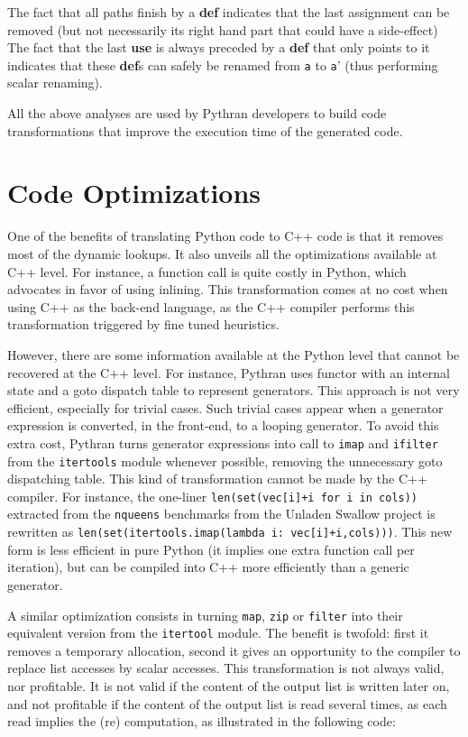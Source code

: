 \documentclass[10pt, onecolumn, preprint]{sigplanconf}
\begin{document}
The fact that all paths finish by a \textbf{def} indicates that the last
assignment can be removed (but not necessarily its right hand part that could
have a side-effect) %
The fact that the last \textbf{use} is always preceded by
a \textbf{def} that only points to it indicates that these \textbf{def}s can
safely be renamed from \texttt{a} to \texttt{a}' (thus performing scalar
renaming).

All the above analyses are used by Pythran developers to build code
transformations that improve the execution time of the generated code.

\section{Code Optimizations}
\label{sec:optimizations}

One of the benefits of translating Python code to C++ code is that it removes
most of the dynamic lookups. It also unveils all the optimizations available at
C++ level. For instance, a function call is quite costly in Python, which
advocates in favor of using inlining. This transformation comes at no cost when
using C++ as the back-end language, as the C++ compiler performs this 
transformation triggered by fine tuned heuristics.

However, there are some information available at the Python level that cannot
be recovered at the C++ level. For instance, Pythran uses functor with an
internal state and a goto dispatch table to represent generators. This approach
is not very efficient, especially for trivial cases.
Such trivial cases appear when a generator expression is converted, in the
front-end, to a looping generator. To avoid this extra cost, Pythran turns
generator expressions into call to \texttt{imap} and \texttt{ifilter} from the
\texttt{itertools} module whenever possible, removing the unnecessary goto
dispatching table. This kind of transformation cannot be made by the C++
compiler. For instance, the one-liner \texttt{len(set(vec[i]+i for i in cols))}
extracted from the \texttt{nqueens} benchmarks from the Unladen Swallow project
is rewritten as \texttt{len(set(itertools.imap(lambda i: vec[i]+i,cols)))}.
This new form is less efficient in pure Python (it implies one extra function
call per iteration), but can be compiled into C++ more efficiently than a
generic generator.

A similar optimization consists in turning \texttt{map}, \texttt{zip} or
\texttt{filter} into their equivalent version from the \texttt{itertool}
module. The benefit is twofold: first it removes a temporary allocation, second
it gives an opportunity to the compiler to replace list accesses by scalar
accesses. This transformation is not always valid, nor profitable. It is not
valid if the content of the output list is written later on, and not profitable
if the content of the output list is read several times, as each read implies
the (re) computation, as illustrated in the following code:
\end{document}
